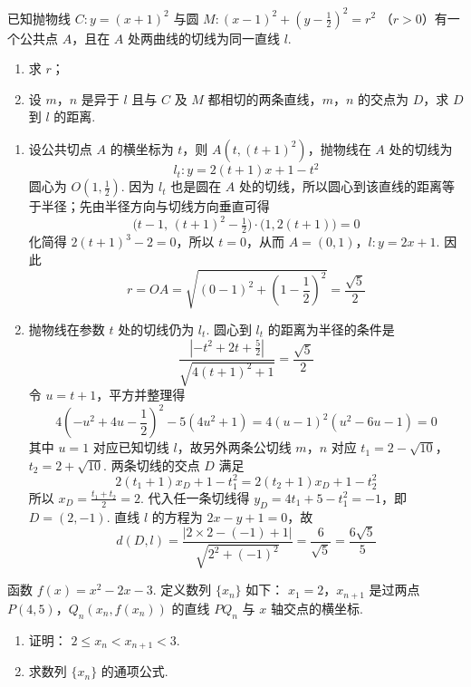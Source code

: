 \begin{problem}
已知抛物线 \(C: y = (x + 1)^2\) 与圆 \(M: (x - 1)^2 + \left(y - \frac{1}{2}\right)^2 = r^2 \) （\(r > 0\)）有一个公共点 \(A\)，且在 \(A\) 处两曲线的切线为同一直线 \(l\).
\begin{enumerate}
\item 求 \(r\)；
\item 设 \(m\)，\(n\) 是异于 \(l\) 且与 \(C\) 及 \(M\) 都相切的两条直线，\(m\)，\(n\) 的交点为 \(D\)，求 \(D\) 到 \(l\) 的距离.
\end{enumerate}
\end{problem}

\begin{solution}
\begin{enumerate}
\item 设公共切点 \(A\) 的横坐标为 \(t\)，则 \(A\left(t,(t+1)^2\right)\)，抛物线在 \(A\) 处的切线为
\[
l_t:y=2(t+1)x+1-t^2
\]
圆心为 \(O\left(1,\frac12\right)\). 因为 \(l_t\) 也是圆在 \(A\) 处的切线，所以圆心到该直线的距离等于半径；先由半径方向与切线方向垂直可得
\[
\bigl(t-1,\,(t+1)^2-\tfrac12\bigr)\cdot\bigl(1,2(t+1)\bigr)=0
\]
化简得 \(2(t+1)^3-2=0\)，所以 \(t=0\)，从而 \(A=(0,1)\)，\(l:y=2x+1\). 因此
\[
r=OA=\sqrt{(0-1)^2+\left(1-\frac12\right)^2}=\frac{\sqrt{5}}{2}
\]
\item 抛物线在参数 \(t\) 处的切线仍为 \(l_t\). 圆心到 \(l_t\) 的距离为半径的条件是
\[
\frac{\left|-t^2+2t+\frac52\right|}{\sqrt{4(t+1)^2+1}}=\frac{\sqrt{5}}{2}
\]
令 \(u=t+1\)，平方并整理得
\[
4\left(-u^2+4u-\frac12\right)^2-5(4u^2+1)=4(u-1)^2(u^2-6u-1)=0
\]
其中 \(u=1\) 对应已知切线 \(l\)，故另外两条公切线 \(m\)，\(n\) 对应
\(t_1=2-\sqrt{10}\)，\(t_2=2+\sqrt{10}\). 两条切线的交点 \(D\) 满足
\[
2(t_1+1)x_D+1-t_1^2=2(t_2+1)x_D+1-t_2^2
\]
所以 \(x_D=\frac{t_1+t_2}{2}=2\). 代入任一条切线得 \(y_D=4t_1+5-t_1^2=-1\)，即 \(D=(2,-1)\). 直线 \(l\) 的方程为 \(2x-y+1=0\)，故
\[
d(D,l)=\frac{|2\times2-(-1)+1|}{\sqrt{2^2+(-1)^2}}=\frac{6}{\sqrt{5}}=\frac{6\sqrt{5}}{5}
\]
\end{enumerate}
\end{solution}

\begin{problem}
函数 \( f(x) = x^2 - 2x - 3 \). 定义数列 \( \{x_n\} \) 如下： \(x_1 = 2\)，\(x_{n+1}\) 是过两点 \(P(4,5)\)，\(Q_n(x_n, f(x_n))\) 的直线 \( PQ_n \) 与 \( x \) 轴交点的横坐标.
\begin{enumerate}
\item 证明： \(2 \leqslant x_{n} < x_{n+1} < 3\).
\item 求数列 \(\{x_{n}\}\) 的通项公式.
\end{enumerate}
\end{problem}

